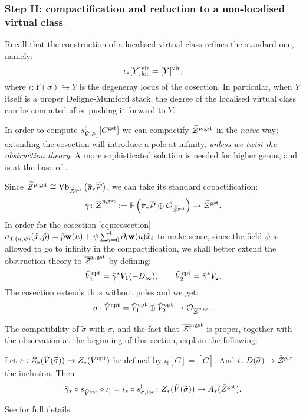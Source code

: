 \subsubsection{Step II: compactification and reduction to a non-localised virtual class}
Recall that the construction of a localised virtual class refines the standard one, namely:
\[\iota_*\virloc{Y}=\virt{Y},\]
where $\iota\colon Y(\sigma)\hookrightarrow Y$ is the degeneray locus of the cosection. In particular, when $Y$ itself is a proper Deligne-Mumford stack, the degree of the localised virtual class can be computed after pushing it forward to $Y$.

In order to compute $s^!_{\tilde V,\tilde\sigma_1}[C^{\rm{gst}}]$ we can compactify $\tZ^{p,\rm{gst}}$ in the \emph{naive} way; extending the cosection will introduce a pole at infinity, \emph{unless we twist the obstruction theory}. A more sophisticated solution is needed for higher genus, and is at the base of \cite{CJRS}.

Since $\tZ^{p,\rm{gst}}\cong\operatorname{Vb}_{\tZ^{\rm{gst}}}\left(\bar{\pi}_*\overline{\mathcal P}\right)$, we can take its standard copactification:
\[\bar{\gamma}\colon \overline{\mathcal Z}^{p,\rm{gst}}:=\PP\left(\bar{\pi}_*\overline{\mathcal P}\oplus \OO_{\tZ^{\rm{gst}}}\right)\to \tZ^{\rm{gst}}.\]
In order for the cosection \eqref{eqn:cosection}
$\sigma_{1|(u,\psi)}(\mathring{x},\mathring{p})=\mathring{p}\w(u)+\psi\sum_{i=0}^4\partial_i\w(u)\mathring{x}_i$
to make sense, since the field $\psi$ is allowed to go to infinity in the compactification, we shall better extend the obstruction theory to $\oZp$ by defining:
\[\tilde{V}^{\rm{cpt}}_1=\bar{\gamma}^*V_1(-D_{\infty}),\qquad \tilde{V}^{\rm{cpt}}_2=\bar{\gamma}^*V_2.\]
The cosection extends thus without poles and we get:
\[\bar{\sigma}\colon \tilde{V}^{\rm{cpt}}=\tilde{V}^{\rm{cpt}}_1\oplus \tilde{V}^{\rm{cpt}}_2\to\OO_{\oZp}. \]
 
 The compatibility of $\tilde\sigma$ with $\bar\sigma$, and the fact that $\oZp$ is proper, together with the observation at the beginning of this section, explain the following:
 \begin{prop}
 Let $\iota_{!}\colon Z_*(\tilde{V}(\widetilde{\sigma}))\to Z_*(\tilde{V}^{\rm{cpt}})$ be defined by 
 $\iota_{!}[C]=[\overline{C}].$ And $i\colon D(\widetilde{\sigma})\to \tZ^{\rm{gst}}$ the inclusion. Then
 \[\bar{\gamma}_*\circ s^{!}_{\tilde{V}^{\rm{cpt}}}\circ\iota_{!}=i_*\circ s^{!}_{\tilde\sigma,\rm{loc}}\colon  Z_*(\tilde{V}(\widetilde{\sigma}))\to A_*(\tilde{Z}^{\rm{gst}}).\]
 \end{prop}
 See \cite[Proposition~6.4]{CL} for full details.
 
